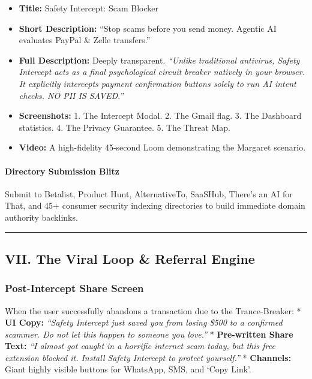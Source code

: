 \documentclass[
]{article}
\providecommand{\tightlist}{%
  \setlength{\itemsep}{0pt}\setlength{\parskip}{0pt}}
\begin{document}
\begin{itemize}
\tightlist
\item
  \textbf{Title:} Safety Intercept: Scam Blocker
\item
  \textbf{Short Description:} ``Stop scams before you send money.
  Agentic AI evaluates PayPal \& Zelle transfers.''
\item
  \textbf{Full Description:} Deeply transparent. \emph{``Unlike
  traditional antivirus, Safety Intercept acts as a final psychological
  circuit breaker natively in your browser. It explicitly intercepts
  payment confirmation buttons solely to run AI intent checks. NO PII IS
  SAVED.''}
\item
  \textbf{Screenshots:} 1. The Intercept Modal. 2. The Gmail flag. 3.
  The Dashboard statistics. 4. The Privacy Guarantee. 5. The Threat Map.
\item
  \textbf{Video:} A high-fidelity 45-second Loom demonstrating the
  Margaret scenario.
\end{itemize}

\paragraph{Directory Submission Blitz}\label{directory-submission-blitz}

Submit to Betalist, Product Hunt, AlternativeTo, SaaSHub, There's an AI
for That, and 45+ consumer security indexing directories to build
immediate domain authority backlinks.

\begin{center}\rule{0.5\linewidth}{0.5pt}\end{center}

\subsection{VII. The Viral Loop \& Referral
Engine}\label{vii.-the-viral-loop-referral-engine}

\subsubsection{Post-Intercept Share
Screen}\label{post-intercept-share-screen}

When the user successfully abandons a transaction due to the
Trance-Breaker: * \textbf{UI Copy:} \emph{``Safety Intercept just saved
you from losing \$500 to a confirmed scammer. Do not let this happen to
someone you love.''} * \textbf{Pre-written Share Text:} \emph{``I almost
got caught in a horrific internet scam today, but this free extension
blocked it. Install Safety Intercept to protect yourself.''} *
\textbf{Channels:} Giant highly visible buttons for WhatsApp, SMS, and
`Copy Link'.
\end{document}

